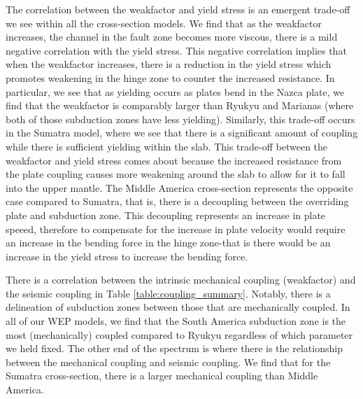 \documentclass[12pt]{article}
\begin{document}
{  The correlation between the weakfactor and yield stress is an emergent trade-off we see within all the cross-section models. We find that as the weakfactor increases, the channel in the fault zone becomes more viscous, there is a mild negative correlation with the yield stress. This negative correlation implies that when the weakfactor increases, there is a reduction in the yield stress which promotes weakening in the hinge zone to counter the increased resistance. In particular, we see that as yielding occurs as plates bend in the Nazca plate, we find that the weakfactor is comparably larger than Ryukyu and Marianas (where both of those subduction zones have less yielding). Similarly, this trade-off occurs in the Sumatra model, where we see that there is a significant amount of coupling while there is sufficient yielding within the slab. This trade-off between the weakfactor and yield stress comes about because the increased resistance from the plate coupling causes more weakening around the slab to allow for it to fall into the upper mantle.  The Middle America cross-section represents the opposite case compared to Sumatra, that is, there is a decoupling between the overriding plate and subduction zone. This decoupling represents an increase in plate speeed, therefore to compensate for the increase in plate velocity would require an increase in the bending force in the hinge zone-that is there would be an increase in the yield stress to increase the bending force.
  
There is a correlation between the intrinsic mechanical coupling (weakfactor) and the seismic coupling in Table \ref{table:coupling_summary}. Notably, there is a delineation of subduction zones between those that are mechanically coupled. In all of our WEP models, we find that the South America subduction zone is the most (mechanically) coupled compared to Ryukyu regardless of which parameter we held fixed. The other end of the spectrum is where there is the relationship between the mechanical coupling and seismic coupling. We find that for the Sumatra cross-section, there is a larger mechanical coupling than Middle America.
   
}
\end{document}
